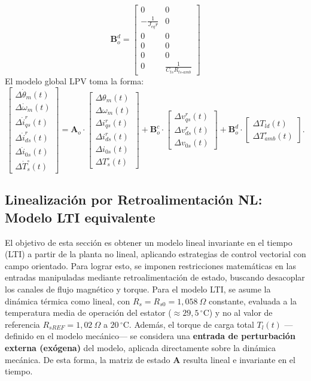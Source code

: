 \documentclass[12pt, a4paper,journal, onecolumn, compsoc]{IEEEtran}
\begin{document}
\begin{equation*}
\bm B_o^d = \begin{bmatrix}
0 & 0 \\
-\frac{1}{J_{eq} r} & 0 \\
0 & 0 \\
0 & 0 \\
0 & 0 \\
0 & \frac{1}{C_{ts} R_{ts\text{-}amb}}
\end{bmatrix} 
\end{equation*}
El modelo global LPV toma la forma:
\begin{equation}
\begin{bmatrix}
\Delta \dot{\theta}_m(t) \\
\Delta \dot{\omega}_m(t) \\
\Delta \dot{i}_{qs}^r(t) \\
\Delta \dot{i}_{ds}^r(t) \\
\Delta \dot{i}_{0s}(t) \\
\Delta \dot{T}_s^\circ(t)
\end{bmatrix} = \bm A_o \cdot
\begin{bmatrix}
\Delta \theta_m(t) \\
\Delta \omega_m(t) \\
\Delta i_{qs}^r(t) \\
\Delta i_{ds}^r(t) \\
\Delta i_{0s}(t) \\
\Delta T_s^\circ(t)
\end{bmatrix} + \bm B_o^c \cdot
\begin{bmatrix}
\Delta v_{qs}^r(t) \\
\Delta v_{ds}^r(t) \\
\Delta v_{0s}(t)
\end{bmatrix} + \bm B_o^d \cdot
\begin{bmatrix}
\Delta T_{ld}(t) \\
\Delta T_{amb}^\circ(t)
\end{bmatrix}.
\end{equation}


\subsection{Linealización por Retroalimentación NL: Modelo LTI equivalente}
El objetivo de esta sección es obtener un modelo lineal invariante en el tiempo (LTI) a partir de la planta no lineal, aplicando estrategias de control vectorial con campo orientado. Para lograr esto, se imponen restricciones matemáticas en las entradas manipuladas mediante retroalimentación de estado, buscando desacoplar los canales de flujo magnético y torque. Para el modelo LTI, se asume la dinámica térmica como lineal, con $R_s = R_{s0} = 1{,}058\ \Omega$ constante, evaluada a la temperatura media de operación del estator ($\approx 29{,}5\,^\circ$C) y no al valor de referencia $R_{sREF} = 1{,}02\ \Omega$ a $20\,^\circ$C. Además, el torque de carga total $T_l(t)$ ---definido en el modelo mecánico--- se considera una \textbf{entrada de perturbación externa (exógena)} del modelo, aplicada directamente sobre la dinámica mecánica. De esta forma, la matriz de estado $\bm{A}$ resulta lineal e invariante en el tiempo.
\end{document}
